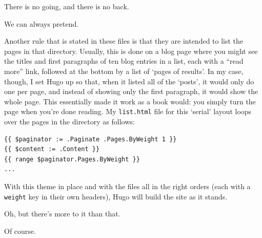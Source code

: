 \begin{paracol}{2}
\begin{leftcolumn}
\begin{ally}
  There is no going, and there is no back.
\end{ally}
We can always pretend.

Another rule that is stated in these files is that they are intended to list the pages in that directory. Usually, this is done on a blog page where you might see the titles and first paragraphs of ten blog entries in a list, each with a ``read more'' link, followed at the bottom by a list of `pages of results'. In my case, though, I set Hugo up so that, when it listed all of the `posts', it would only do one per page, and instead of showing only the first paragraph, it would show the whole page. This essentially made it work as a book would: you simply turn the page when you're done reading. My \texttt{list.html} file for this `serial' layout loops over the pages in the directory as follows:

\begin{verbatim}
{{ $paginator := .Paginate .Pages.ByWeight 1 }}
{{ $content := .Content }}
{{ range $paginator.Pages.ByWeight }}
...
\end{verbatim}

With this theme in place and with the files all in the right orders (each with a \texttt{weight} key in their own headers), Hugo will build the site as it stands.

\begin{ally}
  Oh, but there's more to it than that.
\end{ally}
Of course.


\end{leftcolumn}
\end{paracol}
